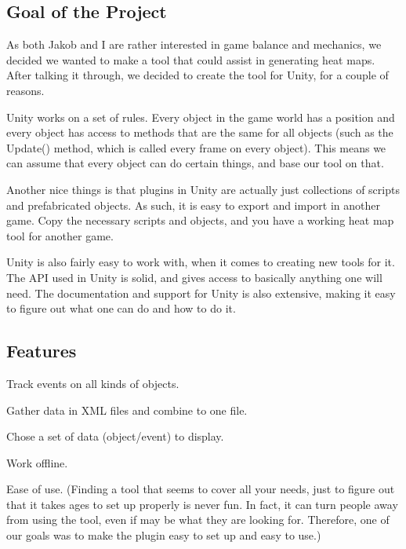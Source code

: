 \subsection{Goal of the Project}
\label{02_01}

As both Jakob and I are rather interested in game balance and mechanics, we decided we wanted to make a tool that could assist in generating heat maps. After talking it through, we decided to create the tool for Unity, for a couple of reasons.

Unity works on a set of rules. Every object in the game world has a position and every object has access to methods that are the same for all objects (such as the Update() method, which is called every frame on every object). This means we can assume that every object can do certain things, and base our tool on that.

Another nice things is that plugins in Unity are actually just collections of scripts and prefabricated objects. As such, it is easy to export and import in another game. Copy the necessary scripts and objects, and you have a working heat map tool for another game.

Unity is also fairly easy to work with, when it comes to creating new tools for it. The API used in Unity is solid, and gives access to basically anything one will need. The documentation and support for Unity is also extensive, making it easy to figure out what one can do and how to do it.

\subsection{Features}
\label{02_02}

Track events on all kinds of objects.

Gather data in XML files and combine to one file.

Chose a set of data (object/event) to display.

Work offline.

Ease of use. (Finding a tool that seems to cover all your needs, just to figure out that it takes ages to set up properly is never fun. In fact, it can turn people away from using the tool, even if may be what they are looking for. Therefore, one of our goals was to make the plugin easy to set up and easy to use.)